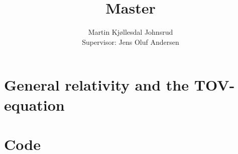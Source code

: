 \documentclass{book}
\title{\huge{Master}}
\author{
    \large{Martin Kjøllesdal Johnsrud }\\
    \normalsize{Supervisor: Jens Oluf Andersen}
    }
\begin{document}
    \maketitle
    \listoftodos
    \tableofcontents


    \chapter{General relativity and the TOV-equation}
    \label{chapter: GR}

    
    
    

    \appendix
    
    \chapter{Code}

    

    \printbibliography
\end{document}
